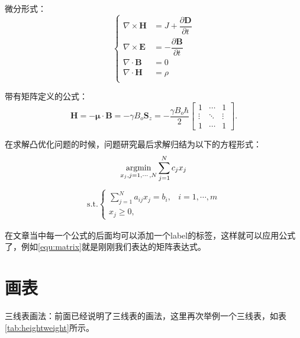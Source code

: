 微分形式：
\begin{equation}
    \begin{cases}
        \nabla\times\mathbf{H}&=J+\dfrac{\partial\mathbf{D}}{\partial{t}}\\
        \nabla\times\mathbf{E}&=-\dfrac{\partial\mathbf{B}}{\partial{t}}\\
        \nabla\cdot\mathbf{B}&=0\\
        \nabla\cdot\mathbf{H}&=\rho\\
    \end{cases}
    \label{equ:diff-function}
\end{equation}

带有矩阵定义的公式：
\begin{equation}
    \mathbf{H} = -\mathbf\mu \cdot \mathbf{B} = -\gamma B_o \mathbf{S}_z = -\frac{\gamma B_o\hbar}{2} 
        \begin{bmatrix}
            1& \cdots &1\\ 
            \vdots & \ddots & \vdots \\
            1 & \cdots & 1 
        \end{bmatrix}.
    \label{equ:matrix}
\end{equation}

在求解凸优化问题的时候，问题研究最后求解归结为以下的方程形式：
\begin{equation}
    \mathop{\mathrm{argmin}}\limits_{x_{j},j=1,\cdots,N}\sum\limits_{j=1}^{N}c_{j}x_{j}
\end{equation}
\begin{eqnarray}
    \text{s.t.}\begin{cases}
        \sum\limits_{j=1}^{N}a_{ij}x_{j}=b_{i},&i=1,\cdots,{m}\\
        x_{j}\geq{0},
    \end{cases}
\end{eqnarray}

在文章当中每一个公式的后面均可以添加一个label的标签，这样就可以应用公式了，例如\cref{equ:matrix}就是刚刚我们表达的矩阵表达式。

\section{画表}
三线表画法：前面已经说明了三线表的画法，这里再次举例一个三线表，如表\ref{tab:heightweight}所示。

